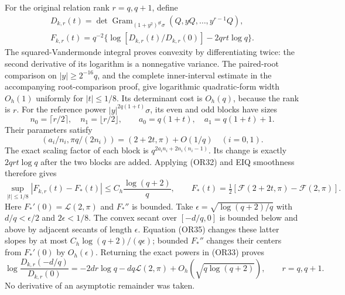\documentclass[11pt,a4paper]{article}
\begin{document}
For the original relation rank \(r=q,q+1\), define
\[
\begin{gathered}
 D_{k,r}(t)=\det\operatorname{Gram}_{(1+y^2)^{qt}\sigma}
                                     (Q,yQ,\ldots,y^{r-1}Q),\\
 F_{k,r}(t)=q^{-2}\{\log[D_{k,r}(t)/D_{k,r}(0)]
                                             -2qrt\log q\}.\end{gathered} \tag{OR33}
\]
The squared-Vandermonde integral proves convexity by
differentiating twice: the second derivative of its logarithm
is a nonnegative variance.  The paired-root comparison on
\(|y|\geq2^{-16}q\), and the complete inner-interval estimate
in the accompanying root-comparison proof, give logarithmic
quadratic-form width \(O_h(1)\) uniformly for \(|t|\leq1/8\).
Its determinant cost is \(O_h(q)\), because the rank is \(r\).
For the reference power \(|y|^{2q(1+t)}\sigma\), its even and
odd blocks have sizes
\[
 n_0=\lceil r/2\rceil,\quad n_1=\lfloor r/2\rfloor,
 \qquad a_0=q(1+t),\quad a_1=q(1+t)+1.
\]
Their parameters satisfy
\[
 (a_i/n_i,\pi q/(2n_i))=(2+2t,\pi)+O(1/q)
 \quad(i=0,1).
 \tag{OR34}
\]
The exact scaling factor of each block is
\(q^{2a_i n_i+2n_i(n_i-1)}\).
Its change is exactly \(2qrt\log q\) after the two blocks
are added.  Applying (OR32) and EIQ smoothness therefore gives
\[
 \sup_{|t|\leq1/8}|F_{k,r}(t)-F_*(t)|
 \leq C_h\frac{\log(q+2)}q,\qquad
 F_*(t)=\tfrac12[\mathcal F(2+2t,\pi)-\mathcal F(2,\pi)] .
 \tag{OR35}
\]
Here \(F_*'(0)=\mathcal L(2,\pi)\) and \(F_*''\) is bounded.
Take \(\epsilon=\sqrt{\log(q+2)/q}\) with
\(d/q<\epsilon/2\) and \(2\epsilon<1/8\).
The convex secant over \([-d/q,0]\) is bounded below and
above by adjacent secants of length \(\epsilon\).
Equation (OR35) changes these latter slopes by at most
\(C_h\log(q+2)/(q\epsilon)\); bounded \(F_*''\) changes their
centers from \(F_*'(0)\) by \(O_h(\epsilon)\).
Returning the exact powers in (OR33) proves
\[
 \log\frac{D_{k,r}(-d/q)}{D_{k,r}(0)}
 =-2dr\log q-dq\mathcal L(2,\pi)
   +O_h(\sqrt{q\log(q+2)}),\qquad r=q,q+1.            \tag{OR36}
\]
No derivative of an asymptotic remainder was taken.
\end{document}
